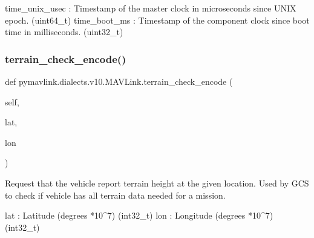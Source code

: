 \begin{DoxyVerb}
\begin{DoxyVerb}
\begin{DoxyVerb}
\begin{DoxyVerb}
\begin{DoxyVerb}
\begin{DoxyVerb}
\begin{DoxyVerb}
\begin{DoxyVerb}
\begin{DoxyVerb}
\begin{DoxyVerb}
\begin{DoxyVerb}
time_unix_usec            : Timestamp of the master clock in microseconds since UNIX epoch. (uint64_t)
time_boot_ms              : Timestamp of the component clock since boot time in milliseconds. (uint32_t)\end{DoxyVerb}
 \mbox{\label{classpymavlink_1_1dialects_1_1v10_1_1MAVLink_a82dcfb013475db3eb34f7260856f51a2}} 
\subsubsection{\texorpdfstring{terrain\+\_\+check\+\_\+encode()}{terrain\_check\_encode()}}
{\footnotesize\ttfamily def pymavlink.\+dialects.\+v10.\+M\+A\+V\+Link.\+terrain\+\_\+check\+\_\+encode (\begin{DoxyParamCaption}\item[{}]{self,  }\item[{}]{lat,  }\item[{}]{lon }\end{DoxyParamCaption})}

\begin{DoxyVerb}Request that the vehicle report terrain height at the given location.
Used by GCS to check if vehicle has all terrain data
needed for a mission.

lat                       : Latitude (degrees *10^7) (int32_t)
lon                       : Longitude (degrees *10^7) (int32_t)\end{DoxyVerb}
 \mbox{\label{classpymavlink_1_1dialects_1_1v10_1_1MAVLink_a4df4e4af01ad4912c3cce23737fd026b}} 

\end{DoxyVerb}
\end{DoxyVerb}
\end{DoxyVerb}
\end{DoxyVerb}
\end{DoxyVerb}
\end{DoxyVerb}
\end{DoxyVerb}
\end{DoxyVerb}
\end{DoxyVerb}
\end{DoxyVerb}
